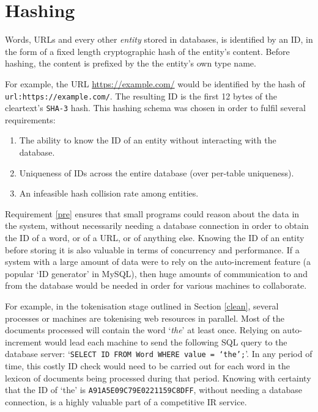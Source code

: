 \section{Hashing\label{hashing}}
Words, URLs and every other {\it entity} stored
in \nr{} databases, is identified by an ID, in the
form of a fixed length cryptographic hash of the entity's
content.  Before hashing, the content is prefixed by the the
entity's own type name.

For example, the URL \url{https://example.com/} would be
identified by the hash of {\tt url:https://example.com/}.
The resulting ID is the first 12 bytes of the cleartext's
{\tt SHA-3} hash.  This hashing schema was chosen in order
to fulfil several requirements:
\begin{enumerate}
    \item The ability to know the ID of an entity without
          interacting with the database.\label{pre}
    \item Uniqueness of IDs across the entire
          database (over per-table uniqueness).\label{uniq}
    \item An infeasible hash collision rate among entities.\label{low}
\end{enumerate}
Requirement \ref{pre} ensures that small programs 
could reason about the data in the \nr{} system,
without necessarily needing a database connection in order to
obtain the ID of a word, or of a URL, or of anything else.
Knowing the ID of an entity before storing it is also
valuable in terms of concurrency and performance.  If a system
with a large amount of data were to rely on the auto-increment
feature (a popular `ID generator' in MySQL), then
huge amounts of communication to and from the database
would be needed in order for various machines to collaborate.

For example, in the tokenisation stage outlined in Section
\ref{clean}, several processes or machines are tokenising web
resources in parallel.  Most of the documents processed will
contain the word `{\it the}' at least once.  Relying on
auto-increment would lead each machine to send the following
SQL query to the database server:
`{\tt SELECT ID FROM Word WHERE value = `the';}'.
In any period of time, this costly ID check would need to be
carried out for each word in the lexicon of documents being
processed during that period.  Knowing with certainty that
the ID of `the' is {\tt A91A5E09C79E0221159C8DFF}, without
needing a database connection, is a highly valuable part of a
competitive IR service.

